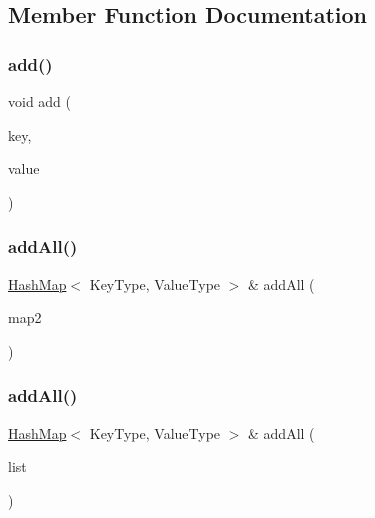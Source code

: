 \subsection{Member Function Documentation}
\mbox{\label{classHashMap_a9129d6095063e7e14d85c627d35086a5}} 
\subsubsection{\texorpdfstring{add()}{add()}}
{\footnotesize\ttfamily void add (\begin{DoxyParamCaption}\item[{const Key\+Type \&}]{key,  }\item[{const Value\+Type \&}]{value }\end{DoxyParamCaption})}

\mbox{\label{classHashMap_acda70726afb75a7250066bb06aff7ef9}} 
\subsubsection{\texorpdfstring{add\+All()}{addAll()}\hspace{0.1cm}{\footnotesize\ttfamily [1/2]}}
{\footnotesize\ttfamily \mbox{\hyperlink{classHashMap}{Hash\+Map}}$<$ Key\+Type, Value\+Type $>$ \& add\+All (\begin{DoxyParamCaption}\item[{const \mbox{\hyperlink{classHashMap}{Hash\+Map}}$<$ Key\+Type, Value\+Type $>$ \&}]{map2 }\end{DoxyParamCaption})}

\mbox{\label{classHashMap_af3638dd6e98fa26a140ace936586fb47}} 
\subsubsection{\texorpdfstring{add\+All()}{addAll()}\hspace{0.1cm}{\footnotesize\ttfamily [2/2]}}
{\footnotesize\ttfamily \mbox{\hyperlink{classHashMap}{Hash\+Map}}$<$ Key\+Type, Value\+Type $>$ \& add\+All (\begin{DoxyParamCaption}\item[{std\+::initializer\+\_\+list$<$ std\+::pair$<$ Key\+Type, Value\+Type $>$ $>$}]{list }\end{DoxyParamCaption})}

